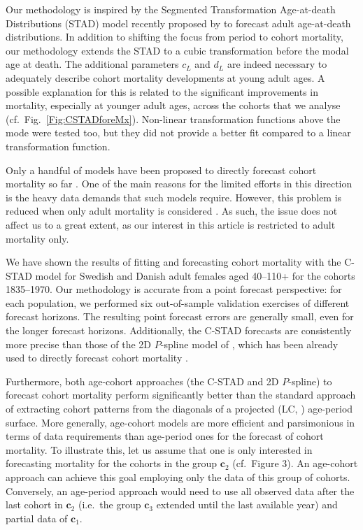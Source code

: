 \documentclass[11pt, a4paper]{article}
\begin{document}
Our methodology is inspired by the Segmented Transformation Age-at-death Distributions (STAD) model recently proposed by \cite{basellini2019modelling} to forecast adult age-at-death distributions. In addition to shifting the focus from period to cohort mortality, our methodology extends the STAD to a cubic transformation before the modal age at death. The additional parameters $c_L$ and $d_L$ are indeed necessary to adequately describe cohort mortality developments at young adult ages. A possible explanation for this is related to the significant improvements in mortality, especially at younger adult ages, across the cohorts that we analyse (cf.~Fig.~\ref{Fig:CSTADforeMx}). Non-linear transformation functions above the mode were tested too, but they did not provide a better fit compared to a linear transformation function. 

Only a handful of models have been proposed to directly forecast cohort mortality so far \citep{chiou2009modeling,zanotto2017reconstruction,rizzi2019forecasting}. One of the main reasons for the limited efforts in this direction is the heavy data demands that such models require. However, this problem is reduced when only adult mortality is considered \citep{booth2006demographic}. As such, the issue does not affect us to a great extent, as our interest in this article is restricted to adult mortality only. 

We have shown the results of fitting and forecasting cohort mortality with the C-STAD model for Swedish and Danish adult females {\color{red}aged 40--110+} for the cohorts 1835--1970. Our methodology is accurate from a point forecast perspective: for each population, we performed six out-of-sample validation exercises of different forecast horizons. The resulting point forecast errors are generally small, even for the longer forecast horizons. Additionally, the C-STAD forecasts are consistently more precise than those of the 2D $P$-spline model of \cite{currie2004smoothing}, which has been already used to directly forecast cohort mortality \citep{cmi2007stochastic}. 

{\color{red} Furthermore, both age-cohort approaches (the C-STAD and 2D $P$-spline) to forecast cohort mortality perform significantly better than the standard approach of extracting cohort patterns from the diagonals of a projected \citeauthor{lee1992modeling} (LC, \citeyear{lee1992modeling}) age-period surface. More generally, age-cohort models are more efficient and parsimonious in terms of data requirements than age-period ones for the forecast of cohort mortality. To illustrate this, let us assume that one is only interested in forecasting mortality for the cohorts in the group $\bm{c}_2$ (cf.~Figure 3). An age-cohort approach can achieve this goal employing only the data of this group of cohorts. Conversely, an age-period approach would need to use all observed data after the last cohort in $\bm{c}_2$ (i.e.~the group $\bm{c}_3$ extended until the last available year) and partial data of $\bm{c}_1$. \par
}
\end{document}
